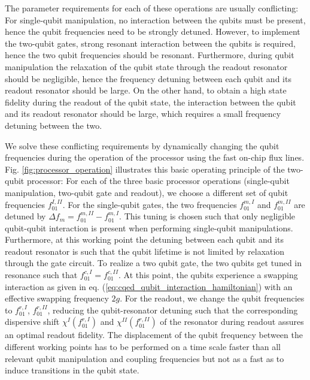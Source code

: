 The parameter requirements for each of these operations are usually conflicting: For single-qubit manipulation, no interaction between the qubits must be present, hence the qubit frequencies need to be strongly detuned. However, to implement the two-qubit gates, strong resonant interaction between the qubits is required, hence the two qubit frequencies should be resonant. Furthermore, during qubit manipulation the relaxation of the qubit state through the readout resonator should be negligible, hence the frequency detuning between each qubit and its readout resonator should be large. On the other hand, to obtain a high state fidelity during the readout of the qubit state, the interaction between the qubit and its readout resonator should be large, which requires a small frequency detuning between the two.

\small

We solve these conflicting requirements by dynamically changing the qubit frequencies during the operation of the processor using the fast on-chip flux lines. Fig. \ref{fig:processor_operation} illustrates this basic operating principle of the two-qubit processor: For each of the three basic processor operations (single-qubit manipulation, two-qubit gate and readout), we choose a different set of qubit frequencies $f_{01}^{I,II}$. For the single-qubit gates, the two frequencies $f_{01}^{m,I}$ and $f_{01}^{m,II}$ are detuned by $\Delta f_m = f_{01}^{m,II}-f_{01}^{m,I}$. This tuning is chosen such that only negligible qubit-qubit interaction is present when performing single-qubit manipulations. Furthermore, at this working point the detuning between each qubit and its readout resonator is such that the qubit lifetime is not limited by relaxation through the gate circuit. To realize a two qubit gate, the two qubits get tuned in resonance such that $f_{01}^{c,I} = f_{01}^{c,II}$. At this point, the qubits experience a swapping interaction as given in eq. (\ref{eq:cqed_qubit_interaction_hamiltonian}) with an effective swapping frequency $2g$. For the readout, we change the qubit frequencies to $f_{01}^{r,I}$, $f_{01}^{r,II}$, reducing the qubit-resonator detuning such that the corresponding dispersive shift $\chi^I(f_{01}^{r,I})$ and $\chi^{II}(f_{01}^{r,II})$ of the resonator during readout assures an optimal readout fidelity. The displacement of the qubit frequency between the different working points has to be performed on a time scale faster than all relevant qubit manipulation and coupling frequencies but not as a fast as to induce transitions in the qubit state.


